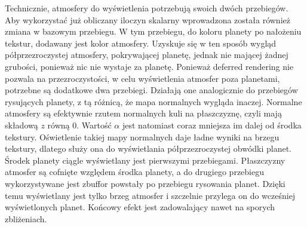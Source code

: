 Technicznie, atmosfery do wyświetlenia potrzebują swoich dwóch przebiegów. Aby wykorzystać już obliczany iloczyn skalarny wprowadzona została również zmiana w bazowym przebiegu. W tym przebiegu, do koloru planety po nałożeniu tekstur, dodawany jest kolor atmosfery. Uzyskuje się w ten sposób wygląd półprzezroczystej atmosfery, pokrywającej planetę, jednak nie mającej żadnej grubości, ponieważ nic nie wystaje za planetę. Ponieważ deferred rendering nie pozwala na przezroczystości, w celu wyświetlenia atmosfer poza planetami, potrzebne są dodatkowe dwa przebiegi. Działają one analogicznie do przebiegów rysujących planety, z tą różnicą, że mapa normalnych wygląda inaczej. Normalne atmosfery są efektywnie rzutem normalnych kuli na płaszczyznę, czyli mają składową $z$ równą $0$. Wartość $\alpha$ jest natomiast coraz mniejsza im dalej od środka tekstury. Oświetlenie takiej mapy normalnych daje ładne wyniki na brzegu tekstury, dlatego służy ona do wyświetlania półprzezroczystej obwódki planet. Środek planety ciągle wyświetlany jest pierwszymi przebiegami. Płaszczyzny atmosfer są cofnięte względem środka planety, a do drugiego przebiegu wykorzystywane jest zbuffor powstały po przebiegu rysowania planet. Dzięki temu wyświetlany jest tylko brzeg atmosfer i szczelnie przylega on do wcześniej wyświetlonych planet. Końcowy efekt jest zadowalający nawet na sporych zbliżeniach.

